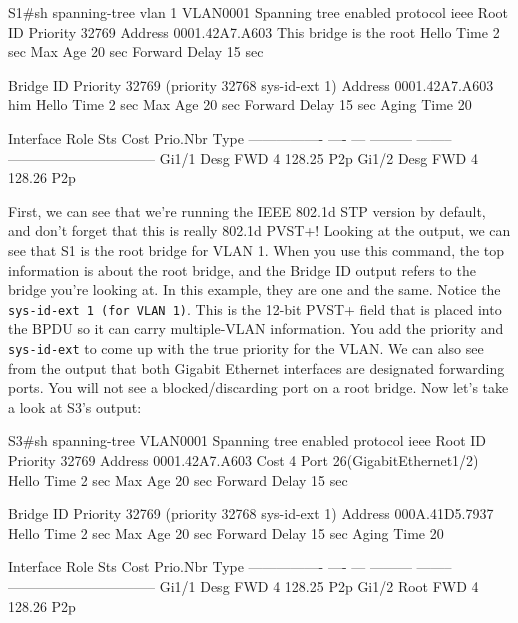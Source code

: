 \begin{cli}
S1#sh spanning-tree vlan 1
VLAN0001
  Spanning tree enabled protocol ieee
  Root ID    Priority    32769
             Address     0001.42A7.A603
             This bridge is the root
             Hello Time  2 sec  Max Age 20 sec  Forward Delay 15 sec
 
  Bridge ID  Priority    32769  (priority 32768 sys-id-ext 1)
             Address     0001.42A7.A603 him
             Hello Time  2 sec  Max Age 20 sec  Forward Delay 15 sec
             Aging Time  20
 
Interface        Role Sts Cost      Prio.Nbr Type
---------------- ---- --- --------- -------- --------------------------------
Gi1/1            Desg FWD 4         128.25   P2p
Gi1/2            Desg FWD 4         128.26   P2p
\end{cli}

First, we can see that we're running the IEEE 802.1d STP version by
default, and don't forget that this is really 802.1d PVST+! Looking at
the output, we can see that S1 is the root bridge for VLAN 1. When you
use this command, the top information is about the root bridge, and the
Bridge ID output refers to the bridge you're looking at. In this
example, they are one and the same. Notice the
\texttt{sys-id-ext\ 1\ (for\ VLAN\ 1)}. This is the 12-bit PVST+ field
that is placed into the BPDU so it can carry multiple-VLAN information.
You add the priority and \texttt{sys-id-ext} to come up with the true
priority for the VLAN. We can also see from the output that both Gigabit
Ethernet interfaces are designated forwarding ports. You will not see a
blocked/discarding port on a root bridge. Now let's take a look at S3's
output:

\begin{cli}
S3#sh spanning-tree
VLAN0001
  Spanning tree enabled protocol ieee
  Root ID    Priority    32769
             Address     0001.42A7.A603
             Cost        4
             Port        26(GigabitEthernet1/2)
             Hello Time  2 sec  Max Age 20 sec  Forward Delay 15 sec
 
  Bridge ID  Priority    32769  (priority 32768 sys-id-ext 1)
             Address     000A.41D5.7937
             Hello Time  2 sec  Max Age 20 sec  Forward Delay 15 sec
             Aging Time  20
 
Interface        Role Sts Cost      Prio.Nbr Type
---------------- ---- --- --------- -------- --------------------------------
Gi1/1            Desg FWD 4         128.25   P2p
Gi1/2            Root FWD 4         128.26   P2p
\end{cli}


